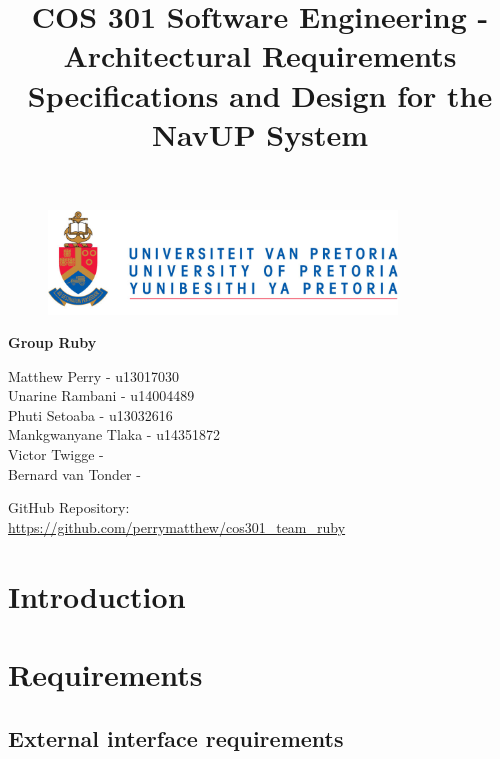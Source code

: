 \documentclass{article}
\begin{document}
		\begin{figure}[t]
			\centering
			\includegraphics[width=350px]{UP_Logo.PNG}
		\end{figure}
			\title{COS 301 Software Engineering -Architectural Requirements Specifications and Design for the NavUP System}
\maketitle
		\begin{center}
			\textbf{\newline Group Ruby} \\
		\end{center}
			
				
		\begin{flushright} \large
			Matthew Perry - u13017030 \\
			Unarine Rambani - u14004489  \\
			Phuti Setoaba -  u13032616\\
			Mankgwanyane Tlaka - u14351872  \\
			Victor Twigge -  \\
			Bernard van Tonder -  \\
		\end{flushright}
		
		
		
		
		GitHub Repository: \href{https://github.com/perrymatthew/cos301_team_ruby}\\
		\url{https://github.com/perrymatthew/cos301_team_ruby}
	

\clearpage
\tableofcontents

\clearpage
\section{Introduction}

\clearpage
\section{Requirements}
	\subsection{External interface requirements}
\end{document}
